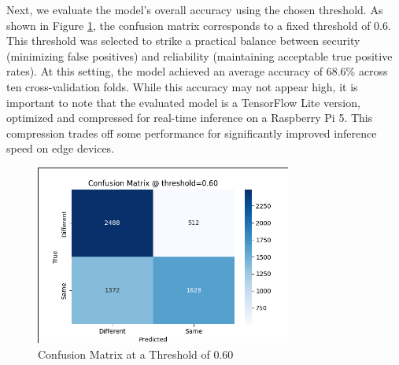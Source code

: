\clearpage
Next, we evaluate the model's overall accuracy using the chosen threshold. As shown in Figure \ref{fig:fixed_thresh}, the confusion matrix corresponds to a fixed threshold of 0.6. This threshold was selected to strike a practical balance between security (minimizing false positives) and reliability (maintaining acceptable true positive rates). At this setting, the model achieved an average accuracy of 68.6\% across ten cross-validation folds. While this accuracy may not appear high, it is important to note that the evaluated model is a TensorFlow Lite version, optimized and compressed for real-time inference on a Raspberry Pi 5. This compression trades off some performance for significantly improved inference speed on edge devices.
\begin{figure}[h] %
	\centering
	\includegraphics[width=0.75\textwidth]{figures/chapter4/fixed_thresh_matrix.png} %
	\caption{Confusion Matrix at a Threshold of 0.60}
	\label{fig:fixed_thresh}
\end{figure}


